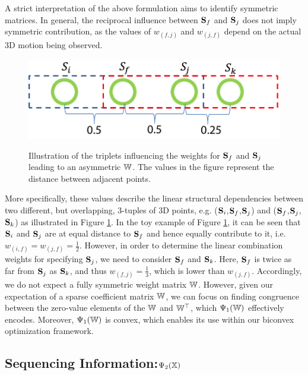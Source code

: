 A strict interpretation of the above formulation aims to identify symmetric matrices.
In general, the reciprocal influence between $\mathbf S_{f}$ and $\mathbf S_{j}$ does not imply symmetric contribution,
as the values of $w_{(f,j)}$ and  $w_{(j,f)}$ depend on the actual 3D motion being observed.
\begin{figure}
  \centering
  \includegraphics[width=0.75\columnwidth]{chapter5/resource/TripletFig.pdf}\\
  \caption{Illustration of the triplets influencing the weights for $\mathbf S_f$ and $\mathbf S_j$ leading to an asymmetric $\mathbb W$. The values in the figure represent the distance between adjacent points.}
  \label{fig:Triplet}
\end{figure}
More specifically, these values describe the linear structural  dependencies between two different, but overlapping, 3-tuples of 3D points, e.g. ($\mathbf S_{i}$,$\mathbf S_{f}$,$\mathbf S_{j}$) and ($\mathbf S_{f}$,$\mathbf S_{j}$,$\mathbf S_{k}$) as illustrated in Figure \ref{fig:Triplet}. In the toy example of Figure \ref{fig:Triplet}, it can be seen that $\mathbf S_{i}$ and $\mathbf S_{j}$ are at equal distance to $\mathbf S_{f}$ and hence equally contribute to it, i.e. $w_{(i,f)} = w_{(j,f)}=\frac{1}{2}$. However, in order to determine the linear combination weights for specifying $\mathbf S_j$, we need to consider $\mathbf S_f$ and $\mathbf S_k$. Here, $\mathbf S_f$ is twice as far from $\mathbf S_j$ as $\mathbf S_k$, and thus $w_{(f,j)}=\frac{1}{3}$, which is lower than $w_{(j,f)}$.
Accordingly, we do not expect a fully symmetric weight matrix   $\mathbb W$. However,  given our expectation of a sparse coefficient matrix $\mathbb W$, we can focus on finding congruence between the zero-value elements of the $\mathbb W$ and $\mathbb W^\top$, which $\Psi_1(\mathbb W)$ effectively encodes.
Moreover, $\Psi_1(\mathbb W)$  is convex, which enables its use within our biconvex optimization framework.

\subsection{Sequencing Information:$\Psi_2(\mathbb X)$}

